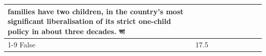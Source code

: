 \begin{table}[H]
\begin{tabular}{lllrlllll}
families have two children, in the country's most significant liberalisation of its strict one-child policy in about three decades. ভা \\
\cline{1-9}
False & 17.5%
\end{tabular}
\end{table}
